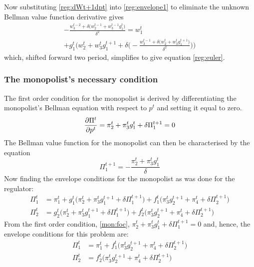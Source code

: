 Now substituting \eqref{reg:dWt+1dpt} into \eqref{reg:envelope1} to
eliminate the unknown Bellman value function derivative gives
\begin{multline}
    -\frac{w^{t-2}_3 + \delta \bigl( w^{t-1}_2 + w^{t-1}_3 g^t_1 \bigr) }{\delta^2} = w^t_1 \\
    + g^t_1 \Biggl( w^t_2 + w^t_3 g^{t+1}_1 + \delta
    \biggl(-\frac{w^{t-1}_3 + \delta \bigl( w^t_2 + w^t_3 g^{t+1}_1 \bigr) }{\delta^2} \biggr) \Biggr)
\end{multline}
which, shifted forward two period, simplifies to give equation
\eqref{reg:euler}.

\subsubsection{The monopolist's necessary condition} The first order
condition for the monopolist is derived by differentiating the
monopolist's Bellman equation with respect to $p^t$ and setting it
equal to zero.
\begin{equation}    \label{mon:foc}
    \frac{\partial \Pi^t}{\partial p^t} = \pi^t_2 + \pi^t_3 g^t_1 + \delta \Pi^{t+1}_1
    = 0
\end{equation}
The Bellman value function for the monopolist can then be
characterised by the equation
\begin{equation}    \label{mon:Bellval}
    \Pi^{t+1}_1 = - \frac{\pi^t_2 + \pi^t_3 g^t_1}{\delta}
\end{equation}
Now finding the envelope conditions for the monopolist as was done
for the regulator:
\begin{align}
    \Pi^t_1 &= \pi^t_1 + g^t_1 \bigl( \pi^t_2 + \pi^t_3 g^{t+1}_1 + \delta \Pi^{t+1}_1 \bigr)
    + f^t_1 \bigl( \pi^t_3 g^{t+1}_2  + \pi^t_4 + \delta \Pi^{t+1}_2
    \bigr) \\
    \Pi^t_2 &= g^t_2 \bigl( \pi^t_2  + \pi^t_3 g^{t+1}_1 + \delta \Pi^{t+1}_1
    \bigr)
    + f^t_2 \bigl( \pi^t_3 g^{t+1}_2 + \pi^t_4 + \delta \Pi^{t+1}_2
    \bigr)
\end{align}
From the first order condition, \eqref{mon:foc}, $\pi^t_2 + \pi^t_3
g^t_1 + \delta \Pi^{t+1}_1 = 0$ and, hence, the envelope conditions
for this problem are:
\begin{align}
    \Pi^t_1 &= \pi^t_1 + f^t_1 \bigl( \pi^t_3 g^{t+1}_2  + \pi^t_4 + \delta \Pi^{t+1}_2
    \bigr)  \label{mon:envelope1}\\
    \Pi^t_2 &= f^t_2 \bigl( \pi^t_3 g^{t+1}_2 + \pi^t_4 + \delta \Pi^{t+1}_2
    \bigr)  \label{mon:envelope2}
\end{align}
